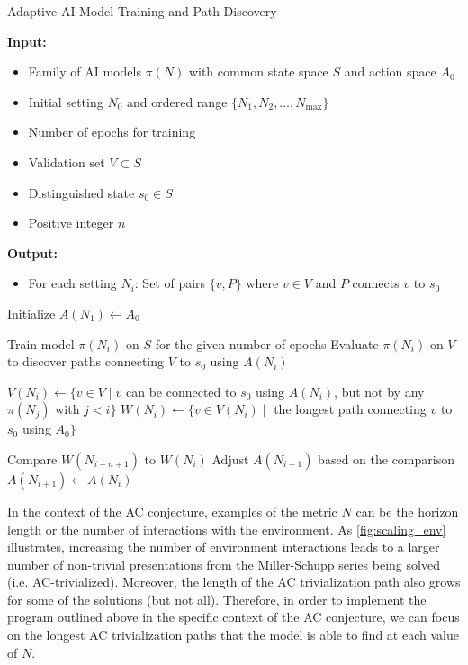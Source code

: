 \begin{algorithm}
	\caption{Adaptive AI Model Training and Path Discovery}
	\label{alg:adaptive_ai_model}
	\begin{algorithmic}[1]
		\State \textbf{Input:}
		\begin{itemize}
			\item[] Family of AI models $\pi(N)$ with common state space $S$ and action space $A_0$
			\item[] Initial setting $N_0$ and ordered range $\{N_1, N_2, \ldots, N_{\text{max}}\}$
			\item[] Number of epochs for training
			\item[] Validation set $V \subset S$
			\item[] Distinguished state $s_0 \in S$
			\item[] Positive integer $n$
		\end{itemize}
		
		\State \textbf{Output:}
		\begin{itemize}
			\item[] For each setting $N_i$: Set of pairs $\{v, P\}$ where $v \in V$ and $P$ connects $v$ to $s_0$
		\end{itemize}
		
		\State Initialize $A(N_1) \gets A_0$
		
		\State Train model $\pi(N_i)$ on $S$ for the given number of epochs
		\State Evaluate $\pi(N_i)$ on $V$ to discover paths connecting $V$ to $s_0$ using $A(N_i)$
		
		\State $V(N_i) \gets \{ v \in V \mid v$ can be connected to $s_0$ using $A(N_i)$, but not by any $\pi(N_j)$ with $j < i\}$
		\State $W(N_i) \gets \{ v \in V(N_i) \mid$ the longest path connecting $v$ to $s_0$ using $A_0 \}$
		
		\State Compare $W(N_{i-n+1})$ to $W(N_i)$
		\State Adjust $A(N_{i+1})$ based on the comparison
		\Else
		\State $A(N_{i+1}) \gets A(N_i)$
		\EndIf
		\EndFor
	\end{algorithmic}
\end{algorithm}

In the context of the AC conjecture, examples of the metric $N$ can be the horizon length or the number of interactions with the environment. As \autoref{fig:scaling_env} illustrates, increasing the number of environment interactions leads to a larger number of non-trivial presentations from the Miller-Schupp series being solved (i.e. AC-trivialized). Moreover, the length of the AC trivialization path also grows for some of the solutions (but not all).
%
Therefore, in order to implement the program outlined above in the specific context of the AC conjecture, we can focus on the longest AC trivialization paths that the model is able to find at each value of $N$.


